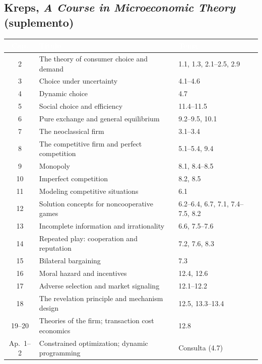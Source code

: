 \documentclass[11pt,a4paper]{article}
\newcommand{\cab}[1]{\textcolor{white}{\sffamily\bfseries #1}}
\newcommand{\filasalternas}{\rowcolors{2}{white}{tonoPalido}}
\begin{document}
\subsection*{Kreps, \emph{A Course in Microeconomic Theory} (suplemento)}
{\small\filasalternas
\noindent\begin{tabularx}{\textwidth}{cXl}
\toprule
\rowcolor{tonoOscuro}\cab{Cap.} & \cab{Título} & \cab{Tema} \\
\midrule
2 & The theory of consumer choice and demand & 1.1, 1.3, 2.1--2.5, 2.9 \\
3 & Choice under uncertainty & 4.1--4.6 \\
4 & Dynamic choice & 4.7 \\
5 & Social choice and efficiency & 11.4--11.5 \\
6 & Pure exchange and general equilibrium & 9.2--9.5, 10.1 \\
7 & The neoclassical firm & 3.1--3.4 \\
8 & The competitive firm and perfect competition & 5.1--5.4, 9.4 \\
9 & Monopoly & 8.1, 8.4--8.5 \\
10 & Imperfect competition & 8.2, 8.5 \\
11 & Modeling competitive situations & 6.1 \\
12 & Solution concepts for noncooperative games & 6.2--6.4, 6.7, 7.1, 7.4--7.5, 8.2 \\
13 & Incomplete information and irrationality & 6.6, 7.5--7.6 \\
14 & Repeated play: cooperation and reputation & 7.2, 7.6, 8.3 \\
15 & Bilateral bargaining & 7.3 \\
16 & Moral hazard and incentives & 12.4, 12.6 \\
17 & Adverse selection and market signaling & 12.1--12.2 \\
18 & The revelation principle and mechanism design & 12.5, 13.3--13.4 \\
19--20 & Theories of the firm; transaction cost economics & 12.8 \\
Ap.~1--2 & Constrained optimization; dynamic programming & Consulta (4.7) \\
\bottomrule
\end{tabularx}
}
\end{document}
